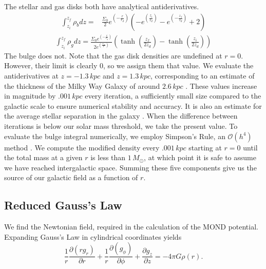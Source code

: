 \documentclass[11pt, twocolumn]{article}
\newcommand{\ff}[2]{\frac{#1}{#2}}
\begin{document}
    The stellar and gas disks both have analytical antiderivatives.
    \begin{equation}
        \begin{aligned}
            \int_{z_i}^{z_f} \rho_b dz = &\ff{\Sigma_0}{2}e^{\left(-\ff{r}{r_d}\right)} \left(-e^{\left(\ff{z_i}{z_d}\right)} - e^{\left(-\ff{z_f}{z_d}\right)} + 2\right)
        \end{aligned}
    \end{equation}
    \begin{equation}
        \begin{aligned}
            \int_{z_i}^{z_f} \rho_g dz = \ff{\Sigma_{0} e^{\left(-\ff{r}{r_d}\right)}}{2e^{\left(\ff{r_m}{r}\right)}} \left(\tanh \left(\ff{z_f}{2z_d}\right) - \tanh \left( \ff{z_i}{2z_d}\right)\right)
        \end{aligned}
    \end{equation}
    The bulge does not. Note that the gas disk densities are undefined at $r = 0$. However, their limit is clearly $0$, so we assign them that value. We evaluate the antiderivatives at $z = -1.3 \, \si{kpc}$ and $z = 1.3 \, \si{kpc}$, corresponding to an estimate of the thickness of the Milky Way Galaxy of around $2.6 \, \si{kpc}$ \parencite{rix_milky_2013}. These values increase in magnitude by $.001 \, \si{kpc}$ every iteration, a sufficiently small size compared to the galactic scale to ensure numerical stability and accuracy. It is also an estimate for the average stellar separation in the galaxy \parencite{noauthor_what_2021}. When the difference between iterations is below our solar mass threshold, we take the present value. To evaluate the bulge integral numerically, we employ Simpson's Rule, an $\mathcal{O}(h^4)$ method \parencite{sauer_numerical_2017}. We compute the modified density every $.001 \si{\, kpc}$ starting at $r = 0$ until the total mass at a given $r$ is less than $1 \si{\, M_\odot}$, at which point it is safe to assume we have reached intergalactic space. Summing these five components give us the source of our galactic field as a function of $r$.
    
    \subsection*{Reduced Gauss's Law}
    We find the Newtonian field, required in the calculation of the MOND potential. Expanding Gauss's Law in cylindrical coordinates yields
    \begin{equation}
    \frac{1}{r}\frac{\partial(rg_r)}{\partial r} + \frac{1}{r}\frac{\partial(g_\phi)}{\partial \phi} + \frac{\partial g_z}{\partial z} = -4\pi G\rho (r).
    \end{equation}
\end{document}
